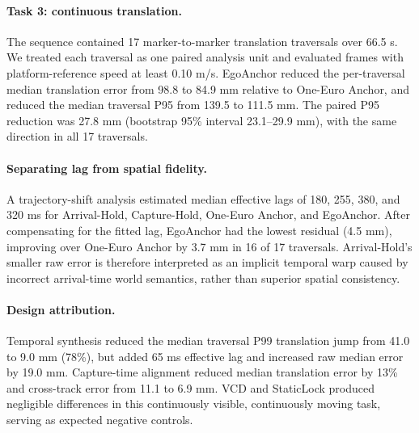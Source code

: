 \paragraph{Task 3: continuous translation.}
The sequence contained 17 marker-to-marker translation traversals over 66.5 s.
We treated each traversal as one paired analysis unit and evaluated frames with platform-reference speed at least 0.10 m/s.
EgoAnchor reduced the per-traversal median translation error from 98.8 to 84.9 mm relative to One-Euro Anchor, and reduced the median traversal P95 from 139.5 to 111.5 mm.
The paired P95 reduction was 27.8 mm (bootstrap 95\% interval 23.1--29.9 mm), with the same direction in all 17 traversals.

\paragraph{Separating lag from spatial fidelity.}
A trajectory-shift analysis estimated median effective lags of 180, 255, 380, and 320 ms for Arrival-Hold, Capture-Hold, One-Euro Anchor, and EgoAnchor.
After compensating for the fitted lag, EgoAnchor had the lowest residual (4.5 mm), improving over One-Euro Anchor by 3.7 mm in 16 of 17 traversals.
Arrival-Hold's smaller raw error is therefore interpreted as an implicit temporal warp caused by incorrect arrival-time world semantics, rather than superior spatial consistency.

\paragraph{Design attribution.}
Temporal synthesis reduced the median traversal P99 translation jump from 41.0 to 9.0 mm (78\%), but added 65 ms effective lag and increased raw median error by 19.0 mm.
Capture-time alignment reduced median translation error by 13\% and cross-track error from 11.1 to 6.9 mm.
VCD and StaticLock produced negligible differences in this continuously visible, continuously moving task, serving as expected negative controls.
